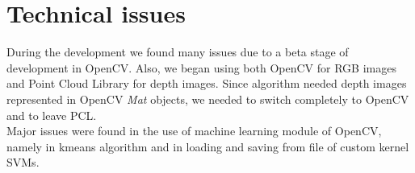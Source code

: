 \documentclass{article}
\begin{document}
\section{Technical issues}
During the development we found many issues due to a beta stage of development in OpenCV. Also, we began using both OpenCV for RGB images and Point Cloud Library for depth images. Since algorithm \citet{Fanelli2011} needed depth images represented in OpenCV \textit{Mat} objects, we needed to switch completely to OpenCV and to leave PCL. \\
Major issues were found in the use of machine learning module of OpenCV, namely in kmeans algorithm and in loading and saving from file of custom kernel SVMs.

\printbibliography
\end{document}
